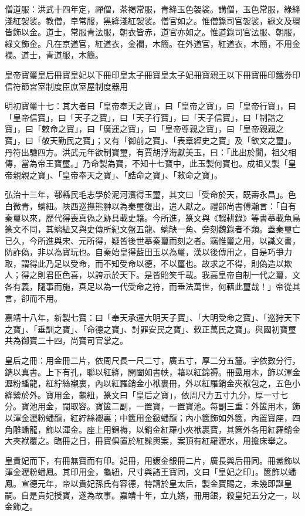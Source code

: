 僧道服：洪武十四年定，禪僧，茶褐常服，青絳玉色袈裟。講僧，玉色常服，綠絳淺紅袈裟。教僧，皁常服，黑絳淺紅袈裟。僧官如之。惟僧錄司官袈裟，綠文及環皆飾以金。道士，常服青法服，朝衣皆赤，道官亦如之。惟道錄司官法服、朝服，綠文飾金。凡在京道官，紅道衣，金襴，木簡。在外道官，紅道衣，木簡，不用金襴。道士，青道服，木簡。

皇帝寶璽皇后冊寶皇妃以下冊印皇太子冊寶皇太子妃冊寶親王以下冊寶冊印鐵券印信符節宮室制度臣庶室屋制度器用

明初寶璽十七：其大者曰「皇帝奉天之寶」，曰「皇帝之寶」，曰「皇帝行寶」，曰「皇帝信寶」，曰「天子之寶」，曰「天子行寶」，曰「天子信寶」，曰「制誥之寶」，曰「敕命之寶」，曰「廣運之寶」，曰「皇帝尊親之寶」，曰「皇帝親親之寶」，曰「敬天勤民之寶」；又有「御前之寶」、「表章經史之寶」及「欽文之璽」。丹符出驗四方。洪武元年欲制寶璽，有賈胡浮海獻美玉，曰：「此出於闐，祖父相傳，當為帝王寶璽。」乃命製為寶，不知十七寶中，此玉製何寶也。成祖又製「皇帝親親之寶」、「皇帝奉天之寶」、「誥命之寶」、「敕命之寶」。

弘治十三年，鄠縣民毛志學於泥河濱得玉璽，其文曰「受命於天，既壽永昌」。色白微青，螭紐。陜西巡撫熊翀以為秦璽復出，遣人獻之。禮部尚書傅瀚言：「自有秦璽以來，歷代得喪真偽之跡具載史籍。今所進，篆文與《輟耕錄》等書摹載魚鳥篆文不同，其螭紐又與史傳所紀文盤五龍、螭缺一角、旁刻魏錄者不類。蓋秦璽亡已久，今所進與宋、元所得，疑皆後世摹秦璽而刻之者。竊惟璽之用，以識文書，防詐偽，非以為寶玩也。自秦始皇得藍田玉以為璽，漢以後傳用之，自是巧爭力取，謂得此乃足以受命，而不知受命以德，不以璽也。故求之不得，則偽造以欺人；得之則君臣色喜，以誇示於天下。是皆貽笑千載。我高皇帝自制一代之璽，文各有義，隨事而施，真足以為一代受命之符，而垂法萬世，何藉此璽哉！」帝從其言，卻而不用。

嘉靖十八年，新製七寶：曰「奉天承運大明天子寶」、「大明受命之寶」、「巡狩天下之寶」、「垂訓之寶」、「命德之寶」、討罪安民之寶」、敕正萬民之寶」。與國初寶璽共為御寶二十四，尚寶司官掌之。

皇后之冊：用金冊二片，依周尺長一尺二寸，廣五寸，厚二分五釐。字依數分行，鐫以真書。上下有孔，聯以紅絳，開闔如書帙，藉以紅錦褥。冊盝用木，飾以渾金瀝粉蟠龍，紅紵絲襯裏，內以紅羅銷金小袱裹冊，外以紅羅銷金夾袱包之，五色小絳縈於外。寶用金，龜紐，篆文曰「皇后之寶」，依周尺方五寸九分，厚一寸七分。寶池用金，闊取容。寶篋二副，一置寶，一置寶池。每副三重：外篋用木，飾以渾金瀝粉蟠龍，紅紵絲襯裏；中篋用金鈒蟠龍；內小篋飾如外篋，內置寶座，四角雕蟠龍，飾以渾金。座上用錦褥，以銷金紅羅小夾袱裹寶，其篋外各用紅羅銷金大夾袱覆之。臨冊之日，冊寶俱置於紅髹輿案，案頂有紅羅瀝水，用擔床舉之。

皇貴妃而下，有冊無寶而有印。妃冊，用鍍金銀冊二片，廣長與后冊同。冊盝飾以渾金瀝粉蟠鳳。其印用金，龜紐，尺寸與諸王寶同，文曰「皇妃之印」。篋飾以蟠鳳。宣德元年，帝以貴妃孫氏有容德，特請於皇太后，製金寶賜之，未幾即誕皇嗣。自是貴妃授寶，遂為故事。嘉靖十年，立九嬪，冊用銀，殺皇妃五分之一，以金飾之。

